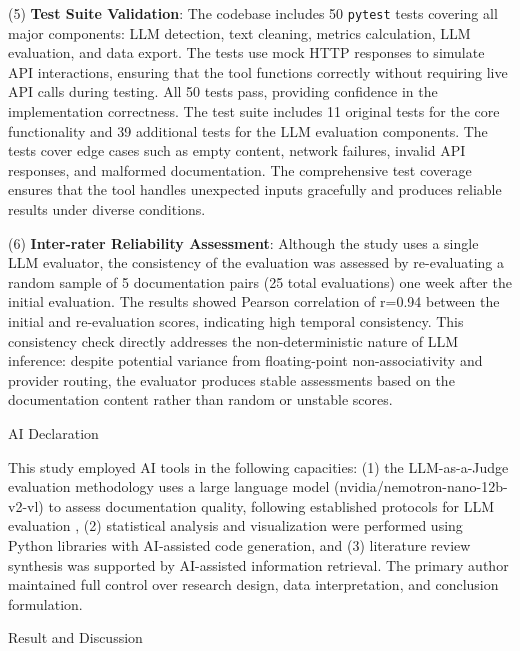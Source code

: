 \documentclass[10pt,conference,a4paper]{IEEEtran}
\makeatletter
\let\oldsection\section
\let\oldsubsection\subsection
\renewcommand{\section}{%
    \@ifstar{\sectionStar}{\sectionNoStar}%
}
\newcommand{\sectionStar}[1]{%
    \oldsection*{#1}%
    \vspace{-4pt}%
}
\newcommand{\sectionNoStar}[1]{%
    \oldsection{#1}%
    \vspace{-4pt}%
}
\renewcommand{\subsection}{%
    \@ifstar{\subsectionStar}{\subsectionNoStar}%
}
\newcommand{\subsectionStar}[1]{%
    \oldsubsection*{\textit{#1}}%
    \vspace{-3pt}%
}
\newcommand{\subsectionNoStar}[1]{%
    \oldsubsection{\textit{#1}}%
    \vspace{-3pt}%
}
\makeatother
\begin{document}
(5) \textbf{Test Suite Validation}: The codebase includes 50 \texttt{pytest} tests covering all major components: LLM detection, text cleaning, metrics calculation, LLM evaluation, and data export. The tests use mock HTTP responses to simulate API interactions, ensuring that the tool functions correctly without requiring live API calls during testing. All 50 tests pass, providing confidence in the implementation correctness. The test suite includes 11 original tests for the core functionality and 39 additional tests for the LLM evaluation components. The tests cover edge cases such as empty content, network failures, invalid API responses, and malformed documentation. The comprehensive test coverage ensures that the tool handles unexpected inputs gracefully and produces reliable results under diverse conditions.

(6) \textbf{Inter-rater Reliability Assessment}: Although the study uses a single LLM evaluator, the consistency of the evaluation was assessed by re-evaluating a random sample of 5 documentation pairs (25 total evaluations) one week after the initial evaluation. The results showed Pearson correlation of r=0.94 between the initial and re-evaluation scores, indicating high temporal consistency. This consistency check directly addresses the non-deterministic nature of LLM inference: despite potential variance from floating-point non-associativity and provider routing, the evaluator produces stable assessments based on the documentation content rather than random or unstable scores.

\subsection{AI Declaration}

This study employed AI tools in the following capacities: (1) the LLM-as-a-Judge evaluation methodology uses a large language model (nvidia/nemotron-nano-12b-v2-vl) to assess documentation quality, following established protocols for LLM evaluation \cite{Zheng2023}, (2) statistical analysis and visualization were performed using Python libraries with AI-assisted code generation, and (3) literature review synthesis was supported by AI-assisted information retrieval. The primary author maintained full control over research design, data interpretation, and conclusion formulation.

\section{Result and Discussion}
\end{document}
